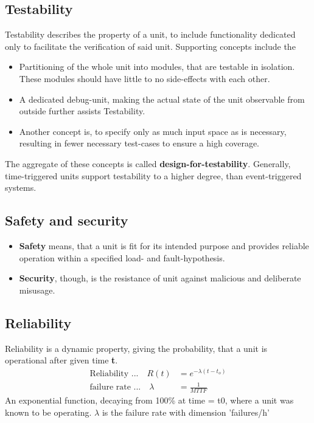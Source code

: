 	\subsection{Testability}
	{Testability} describes the property of a unit, to include functionality dedicated only to facilitate the verification of said unit. Supporting concepts include the \\
	\begin{itemize}
		\item Partitioning of the whole unit into modules, that are testable in isolation. These modules should have little to no side-effects with each other. 
		\item A dedicated debug-unit, making the actual state of the unit observable from outside further assists Testability. 
		\item Another concept is, to specify only as much input space as is necessary, resulting in fewer necessary test-cases to ensure a high coverage.
	\end{itemize}

	The aggregate of these concepts is called {\bf design-for-testability}.
	Generally, time-triggered units support testability to a higher degree, than event-triggered systems.
	\subsection{Safety and security}
	\begin{itemize}
		\item {\bf Safety} means, that a unit is fit for its intended purpose and provides reliable operation within a specified load- and fault-hypothesis.
		\item {\bf Security}, though, is the resistance of unit against malicious and deliberate misusage.
	\end{itemize}
	\subsection{Reliability}
	{Reliability} is a dynamic property, giving the probability, that a unit is operational after given time {\bf t}.
		\begin{align*}
		\textrm{Reliability ...} \quad R(t) & = e^{-\lambda (t-t_o) }\\
		\textrm{failure rate ...}  \quad \lambda & = \frac{1}{MTTF} 
		\end{align*}
	An exponential function, decaying from 100\% at time = t0, where a unit was known to be operating. $\lambda$ is the failure rate with dimension 'failures/h'
	
